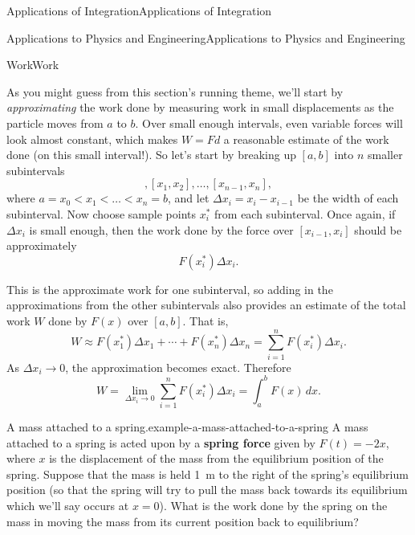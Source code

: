 \documentclass[10pt,]{book}
\newcommand{\terminology}[1]{\textbf{#1}}
\numberwithin{equation}{section}
\newcommand{\lt}{<}
\begin{document}
\begin{chapterptx}{Applications of Integration}{}{Applications of Integration}{}{}
\begin{sectionptx}{Applications to Physics and Engineering}{}{Applications to Physics and Engineering}{}{}
\begin{subsectionptx}{Work}{}{Work}{}{}
\par
\hypertarget{p-683}{}%
As you might guess from this section's running theme, we'll start by \emph{approximating} the work done by measuring work in small displacements as the particle moves from \(a\) to \(b\). Over small enough intervals, even variable forces will look almost constant, which makes \(W = Fd\) a reasonable estimate of the work done (on this small interval!). So let's start by breaking up \([a,b]\) into \(n\) smaller subintervals%
\begin{equation*}
[x_{0}, x_{1}], [x_{1}, x_{2}], \ldots, [x_{n-1}, x_{n}],
\end{equation*}
where \(a = x_{0} \lt x_{1} \lt \ldots \lt x_{n} = b\), and let \(\Delta x_{i} = x_{i} - x_{i-1}\) be the width of each subinterval. Now choose sample points \(x_{i}^{*}\) from each subinterval. Once again, if \(\Delta x_{i}\) is small enough, then the work done by the force over \([x_{i-1}, x_{i}]\) should be approximately%
\begin{equation*}
F(x_{i}^{*})\Delta x_{i}.
\end{equation*}
%
\par
\hypertarget{p-684}{}%
This is the approximate work for one subinterval, so adding in the approximations from the other subintervals also provides an estimate of the total work \(W\) done by \(F(x)\) over \([a,b]\). That is,%
\begin{equation*}
W \approx F(x_{1}^{*})\Delta x_{1} + \cdots + F(x_{n}^{*})\Delta x_{n} = \sum_{i=1}^{n}F(x_{i}^{*})\Delta x_{i}.
\end{equation*}
As \(\Delta x_{i}\to 0\), the approximation becomes exact. Therefore%
\begin{equation}
W = \lim_{\Delta x_{i}\to 0}\sum_{i=1}^{n}F(x_{i}^{*})\Delta x_{i} = \int_{a}^{b}F(x)\,dx.\label{equation-work-integral}
\end{equation}
%
\begin{example}{A mass attached to a spring.}{example-a-mass-attached-to-a-spring}%
\hypertarget{p-685}{}%
A mass attached to a spring is acted upon by a \terminology{spring force} given by \(F(t) = -2x\), where \(x\) is the displacement of the mass from the equilibrium position of the spring. Suppose that the mass is held \SI{1}{\meter} to the right of the spring's equilibrium position (so that the spring will try to pull the mass back towards its equilibrium which we'll say occurs at \(x = 0\)). What is the work done by the spring on the mass in moving the mass from its current position back to equilibrium?%
\par\smallskip%

\end{example}
\end{subsectionptx}
\end{sectionptx}
\end{chapterptx}
\end{document}
